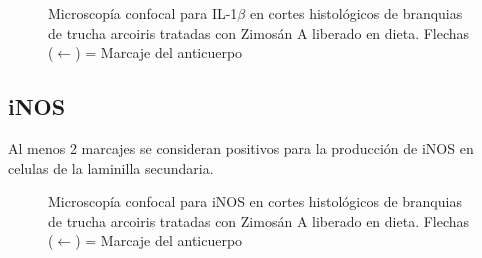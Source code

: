 \documentclass[12pt,letterpaper,oneside]{scrbook}
\begin{document}
\begin{figure}[h!]
    \centering
    \caption[Microscopía Confocal para IL-1$\beta$]{Microscopía confocal para IL-1$\beta$ en cortes histológicos de branquias de trucha arcoiris tratadas con Zimosán A liberado en dieta.  Flechas ($\leftarrow$) = Marcaje del anticuerpo}
    \label {fig:gills:il1b}
\end{figure}

\subsection{iNOS}

Al menos 2 marcajes se consideran positivos para la producción de iNOS
en celulas de la laminilla secundaria.

\begin{figure}[h!]
    \centering
    \caption[Microscopía Confocal para iNOS]{Microscopía confocal para iNOS en cortes histológicos de branquias de trucha arcoiris tratadas con Zimosán A liberado en dieta. Flechas ($\leftarrow$) = Marcaje del anticuerpo}
    \label {fig:gills:inos}
\end{figure}
\end{document}
